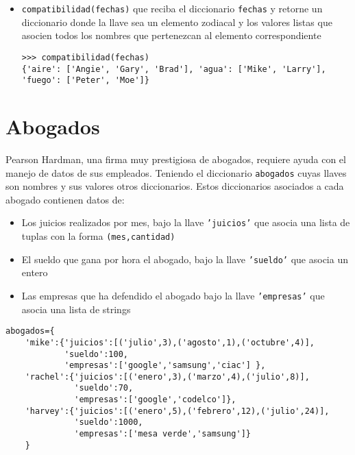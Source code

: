 \documentclass[spanish, fleqn]{scrartcl}
\begin{document}
 

\begin{itemize}
    \item \texttt{compatibilidad(fechas)} que reciba el diccionario \texttt{fechas} y retorne un diccionario donde la llave sea un elemento zodiacal y los valores listas que asocien todos los nombres que pertenezcan al elemento correspondiente
\begin{lstlisting}[style=consola]
>>> compatibilidad(fechas)
{'aire': ['Angie', 'Gary', 'Brad'], 'agua': ['Mike', 'Larry'],
'fuego': ['Peter', 'Moe']}
\end{lstlisting}

\end{itemize}
\pagebreak[4]
\section{Abogados}

Pearson Hardman, una firma muy prestigiosa de abogados, requiere ayuda con el manejo de datos de sus empleados. Teniendo el diccionario \texttt{abogados} cuyas llaves son nombres y sus valores otros diccionarios. Estos diccionarios asociados a cada abogado contienen datos de:
\begin{itemize}
    \item Los juicios realizados por mes, bajo la llave \texttt{'juicios'} que asocia una lista de tuplas con la forma \texttt{(mes,cantidad)}
    \item El sueldo que gana por hora el abogado, bajo la llave \texttt{'sueldo'} que asocia un entero
    \item Las empresas que ha defendido el abogado bajo la llave \texttt{'empresas'} que asocia una lista de strings
\end{itemize}

\begin{lstlisting}[style=consola]
abogados={
    'mike':{'juicios':[('julio',3),('agosto',1),('octubre',4)],
            'sueldo':100,
            'empresas':['google','samsung','ciac'] },
    'rachel':{'juicios':[('enero',3),('marzo',4),('julio',8)],
              'sueldo':70,
              'empresas':['google','codelco']},
    'harvey':{'juicios':[('enero',5),('febrero',12),('julio',24)],
              'sueldo':1000,
              'empresas':['mesa verde','samsung']}
    }
\end{lstlisting}
\end{document}
